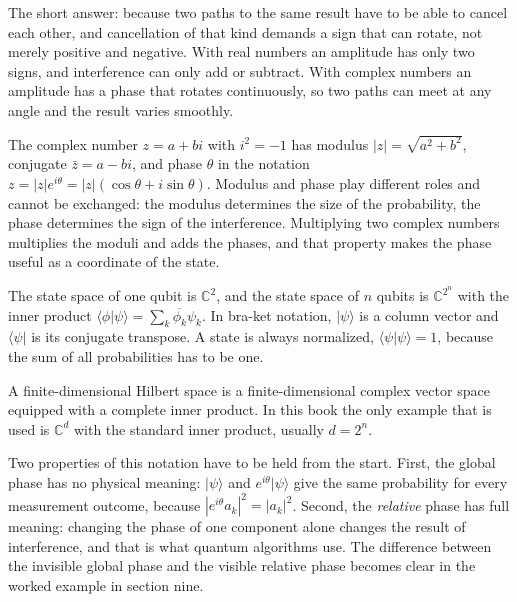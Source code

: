 The short answer: because two paths to the same result have to be able to cancel each
other, and cancellation of that kind demands a sign that can rotate, not merely positive
and negative. With real numbers an amplitude has only two signs, and interference can
only add or subtract. With complex numbers an amplitude has a phase that rotates
continuously, so two paths can meet at any angle and the result varies smoothly.

The complex number $z=a+bi$ with $i^2=-1$ has modulus $|z|=\sqrt{a^2+b^2}$, conjugate
$\bar z=a-bi$, and phase $\theta$ in the notation
$z=|z|e^{i\theta}=|z|(\cos\theta+i\sin\theta)$. Modulus and phase play different roles and
cannot be exchanged: the modulus determines the size of the probability, the phase
determines the sign of the interference. Multiplying two complex numbers multiplies the
moduli and adds the phases, and that property makes the phase useful as a coordinate of
the state.


The state space of one qubit is $\mathbb{C}^2$, and the state space of $n$ qubits is
$\mathbb{C}^{2^n}$ with the inner product
$\langle\phi|\psi\rangle=\sum_k\overline{\phi_k}\psi_k$. In bra-ket notation,
$|\psi\rangle$ is a column vector and $\langle\psi|$ is its conjugate transpose. A state
is always normalized, $\langle\psi|\psi\rangle=1$, because the sum of all probabilities
has to be one.

\begin{definisi}
A finite-dimensional Hilbert space is a finite-dimensional complex vector space equipped
with a complete inner product. In this book the only example that is used is
$\mathbb{C}^{d}$ with the standard inner product, usually $d=2^{n}$.
\end{definisi}

Two properties of this notation have to be held from the start. First, the global phase
has no physical meaning: $|\psi\rangle$ and $e^{i\theta}|\psi\rangle$ give the same
probability for every measurement outcome, because $|e^{i\theta}a_k|^2=|a_k|^2$. Second,
the \emph{relative} phase has full meaning: changing the phase of one component alone
changes the result of interference, and that is what quantum algorithms use. The
difference between the invisible global phase and the visible relative phase becomes
clear in the worked example in section nine.


